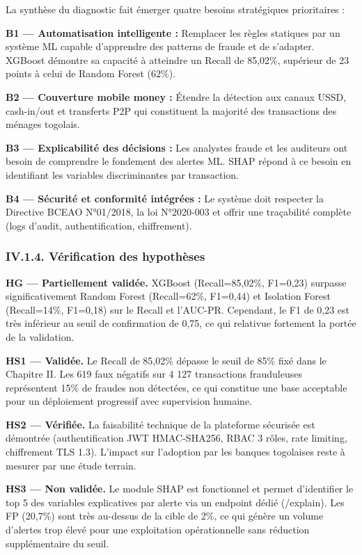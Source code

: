 \documentclass[
  12pt,
]{article}
\begin{document}
La synthèse du diagnostic fait émerger quatre besoins stratégiques
prioritaires :

\textbf{B1 — Automatisation intelligente :} Remplacer les règles
statiques par un système ML capable d’apprendre des patterns de fraude
et de s’adapter. XGBoost démontre sa capacité à atteindre un Recall de
85,02\%, supérieur de 23 points à celui de Random Forest (62\%).

\textbf{B2 — Couverture mobile money :} Étendre la détection aux canaux
USSD, cash-in/out et transferts P2P qui constituent la majorité des
transactions des ménages togolais.

\textbf{B3 — Explicabilité des décisions :} Les analystes fraude et les
auditeurs ont besoin de comprendre le fondement des alertes ML. SHAP
répond à ce besoin en identifiant les variables discriminantes par
transaction.

\textbf{B4 — Sécurité et conformité intégrées :} Le système doit
respecter la Directive BCEAO N°01/2018, la loi N°2020-003 et offrir une
traçabilité complète (logs d’audit, authentification, chiffrement).

\subsubsection{IV.1.4. Vérification des
hypothèses}\label{iv.1.4.-vuxe9rification-des-hypothuxe8ses}

\textbf{HG — Partiellement validée.} XGBoost (Recall=85,02\%, F1=0,23)
surpasse significativement Random Forest (Recall=62\%, F1=0,44) et
Isolation Forest (Recall=14\%, F1=0,18) sur le Recall et l’AUC-PR.
Cependant, le F1 de 0,23 est très inférieur au seuil de confirmation de
0,75, ce qui relativue fortement la portée de la validation.

\textbf{HS1 — Validée.} Le Recall de 85,02\% dépasse le seuil de 85\%
fixé dans le Chapitre II. Les 619 faux négatifs sur 4 127 transactions
frauduleuses représentent 15\% de fraudes non détectées, ce qui
constitue une base acceptable pour un déploiement progressif avec
supervision humaine.

\textbf{HS2 — Vérifiée.} La faisabilité technique de la plateforme
sécurisée est démontrée (authentification JWT HMAC-SHA256, RBAC 3 rôles,
rate limiting, chiffrement TLS 1.3). L’impact sur l’adoption par les
banques togolaises reste à mesurer par une étude terrain.

\textbf{HS3 — Non validée.} Le module SHAP est fonctionnel et permet
d’identifier le top 5 des variables explicatives par alerte via un
endpoint dédié (/explain). Les FP (20,7\%) sont très au-dessus de la
cible de 2\%, ce qui génère un volume d’alertes trop élevé pour une
exploitation opérationnelle sans réduction supplémentaire du seuil.
\end{document}
